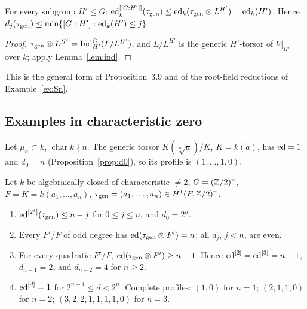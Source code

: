 \begin{corollary}\label{cor:sub}
For every subgroup $H'\le G$: $\operatorname{ed}^{[[G:H']]}_k(\tau_{\mathrm{gen}})\le\operatorname{ed}_k(\tau_{\mathrm{gen}}\otimes
L^{H'})=\operatorname{ed}_k(H')$. Hence $d_j(\tau_{\mathrm{gen}})\le\min\{[G:H']:\operatorname{ed}_k(H')\le j\}$.
\end{corollary}

\begin{proof}
$\tau_{\mathrm{gen}}\otimes L^{H'}=\operatorname{Ind}_{H'}^G(L/L^{H'})$, and $L/L^{H'}$ is the generic
$H'$-torsor of $V|_{H'}$ over $k$; apply Lemma~\ref{lem:ind}.
\end{proof}

This is the general form of Proposition~3.9 and of the root-field reductions of
Example~\ref{ex:Sn}.

\subsection{Examples in characteristic zero}

\begin{example}[$\Z/n$]\label{ex:cyc}
Let $\mu_n\subset k$, $\operatorname{char}k\nmid n$. The generic torsor
$K(\sqrt[n]a)/K$, $K=k(a)$, has $\operatorname{ed}=1$ and $d_0=n$ (Proposition~\ref{prop:d0}), so
its profile is $(1,\dots,1,0)$. 
\end{example}

\begin{theorem}[$(\Z/2)^n$]\label{thm:ea}
Let $k$ be algebraically closed of characteristic $\ne2$, $G=(\mathbb Z/2)^n$,
$F=K=k(a_1,\dots,a_n)$, $\tau_{\mathrm{gen}}=(a_1,\dots,a_n)\in H^1(F,\mathbb Z/2)^n$.
\begin{enumerate}
\item[(a)] $\operatorname{ed}^{[2^j]}(\tau_{\mathrm{gen}})\le n-j$ for $0\le j\le n$, and $d_0=2^n$.
\item[(b)] Every $F'/F$ of odd degree has $\operatorname{ed}(\tau_{\mathrm{gen}}\otimes F')=n$; all $d_j$,
$j<n$, are even.
\item[(c)] For every quadratic $F'/F$, $\operatorname{ed}(\tau_{\mathrm{gen}}\otimes F')\ge n-1$. Hence
$\operatorname{ed}^{[2]}=\operatorname{ed}^{[3]}=n-1$, $d_{n-1}=2$, and $d_{n-2}=4$ for $n\ge2$.
\item[(d)] $\operatorname{ed}^{[d]}=1$ for $2^{n-1}\le d<2^n$. Complete profiles: $(1,0)$ for $n=1$;
$(2,1,1,0)$ for $n=2$; $(3,2,2,1,1,1,1,0)$ for $n=3$.
\end{enumerate}
\end{theorem}

